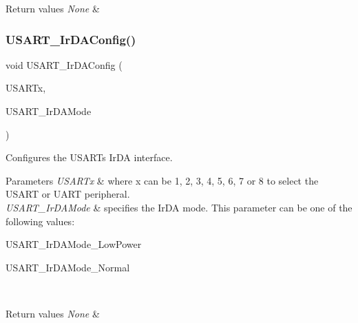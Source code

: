 \begin{DoxyRetVals}{Return values}
{\em None} & \\
\hline
\end{DoxyRetVals}
\mbox{\label{group___u_s_a_r_t_ga81a0cd36199040bf6d266b57babd678e}} 
\subsubsection{\texorpdfstring{U\+S\+A\+R\+T\+\_\+\+Ir\+D\+A\+Config()}{USART\_IrDAConfig()}}
{\footnotesize\ttfamily void U\+S\+A\+R\+T\+\_\+\+Ir\+D\+A\+Config (\begin{DoxyParamCaption}\item[{U\+S\+A\+R\+T\+\_\+\+Type\+Def $\ast$}]{U\+S\+A\+R\+Tx,  }\item[{uint16\+\_\+t}]{U\+S\+A\+R\+T\+\_\+\+Ir\+D\+A\+Mode }\end{DoxyParamCaption})}



Configures the U\+S\+A\+RT\textquotesingle{}s Ir\+DA interface. 


\begin{DoxyParams}{Parameters}
{\em U\+S\+A\+R\+Tx} & where x can be 1, 2, 3, 4, 5, 6, 7 or 8 to select the U\+S\+A\+RT or U\+A\+RT peripheral. \\
\hline
{\em U\+S\+A\+R\+T\+\_\+\+Ir\+D\+A\+Mode} & specifies the Ir\+DA mode. This parameter can be one of the following values\+: \begin{DoxyItemize}
\item U\+S\+A\+R\+T\+\_\+\+Ir\+D\+A\+Mode\+\_\+\+Low\+Power \item U\+S\+A\+R\+T\+\_\+\+Ir\+D\+A\+Mode\+\_\+\+Normal \end{DoxyItemize}
\\
\hline
\end{DoxyParams}

\begin{DoxyRetVals}{Return values}
{\em None} & \\
\hline
\end{DoxyRetVals}
\mbox{\label{group___u_s_a_r_t_ga6d8f2dd1f34060ae7e386e3e5d56b6f6}} 
